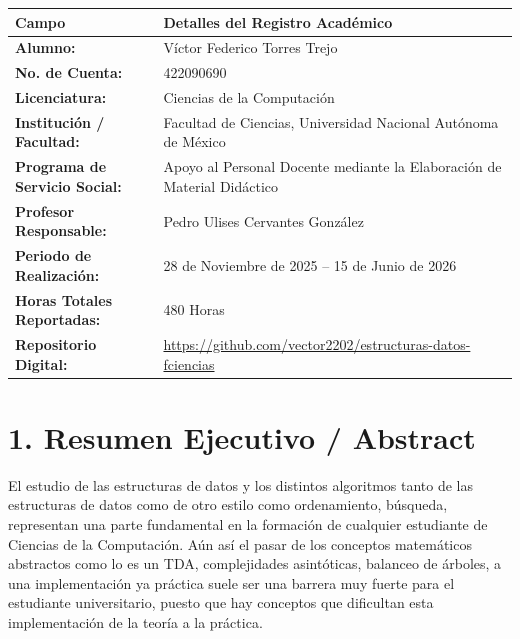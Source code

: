 \documentclass[12 pt]{article}
\begin{document}
\begin{table}[H]
\centering
\begin{tabular}{|p{5.5cm}|p{11.0cm}|}
\hline
\textbf{Campo} & \textbf{Detalles del Registro Académico} \\ \hline
\textbf{Alumno:} & Víctor Federico Torres Trejo \\ \hline
\textbf{No. de Cuenta:} & 422090690 \\ \hline
\textbf{Licenciatura:} & Ciencias de la Computación \\ \hline
\textbf{Institución / Facultad:} & Facultad de Ciencias, Universidad Nacional Autónoma de México \\ \hline
\textbf{Programa de Servicio Social:} & Apoyo al Personal Docente mediante la Elaboración de Material Didáctico \\ \hline
\textbf{Profesor Responsable:} & Pedro Ulises Cervantes González \\ \hline
\textbf{Periodo de Realización:} & 28 de Noviembre de 2025 – 15 de Junio de 2026 \\ \hline
\textbf{Horas Totales Reportadas:} & 480 Horas \\ \hline
\textbf{Repositorio Digital:} & \url{https://github.com/vector2202/estructuras-datos-fciencias} \\ \hline
\end{tabular}
\end{table}

\clearpage

\section*{1. Resumen Ejecutivo / Abstract}

El estudio de las estructuras de datos y los distintos algoritmos tanto de las estructuras de datos como de otro estilo como ordenamiento, búsqueda, representan una parte fundamental en la formación de cualquier estudiante de Ciencias de la Computación. Aún así el pasar de los conceptos matemáticos abstractos como lo es un TDA, complejidades asintóticas, balanceo de árboles, a una implementación ya práctica suele ser una barrera muy fuerte para el estudiante universitario, puesto que hay conceptos que dificultan esta implementación de la teoría a la práctica.
\end{document}

